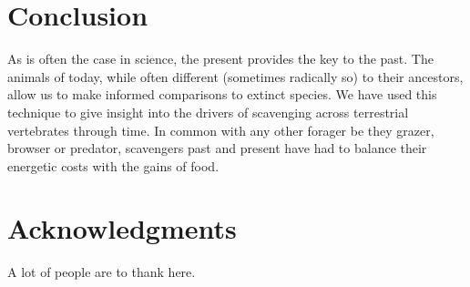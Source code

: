 \documentclass[a4paper,12pt]{article}
\begin{document}
\section*{Conclusion} 
As is often the case in science, the present provides the key to the past. The animals of today, while often different (sometimes radically so) to their ancestors, allow us to make informed comparisons to extinct species. We have used this technique to give insight into the drivers of scavenging across terrestrial vertebrates through time. 
In common with any other forager be they grazer, browser or predator, scavengers past and present have had to balance their energetic costs with the gains of food. 


\section*{Acknowledgments}

A lot of people are to thank here.


\newpage



\end{document}
